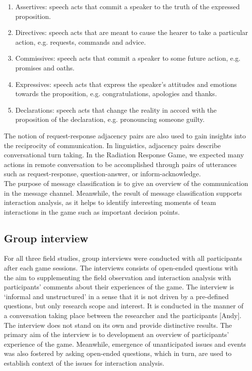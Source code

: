\begin{enumerate}
\item Assertives: speech acts that commit a speaker to the truth of the expressed proposition.
\item Directives: speech acts that are meant to cause the hearer to take a particular action, e.g. requests, commands and advice.
\item Commissives: speech acts that commit a speaker to some future action, e.g. promises and oaths.
\item Expressives: speech acts that express the speaker's attitudes and emotions towards the proposition, e.g. congratulations, apologies and thanks.
\item Declarations: speech acts that change the reality in accord with the proposition of the declaration, e.g. pronouncing someone guilty.
\end{enumerate}

The notion of request-response adjacency pairs are also used to gain insights into the reciprocity of communication. In linguistics, adjacency pairs describe conversational turn taking. In the Radiation Response Game, we expected many actions in remote conversation to be accomplished through pairs of utterances such as request-response, question-answer, or inform-acknowledge.\\

The purpose of message classification is to give an overview of the communication in the message channel. Meanwhile, the result of message classification supports interaction analysis, as it helps to identify interesting moments of team interactions in the game such as important decision points.\\

\subsection{Group interview}
For all three field studies, group interviews were conducted with all participants after each game sessions. The interviews consists of open-ended questions with the aim to supplementing the field observation and interaction analysis with participants' comments about their experiences of the game. The interview is `informal and unstructured' in a sense that it is not driven by a pre-defined questions, but only research scope and interest. It is conducted in the manner of a conversation taking place between the researcher and the participants [Andy].  The interview does not stand on its own and provide distinctive results. The primary aim of the interview is to development an overview of participants' experience of the game. Meanwhile, emergence of unanticipated issues and events was also fostered by asking open-ended questions, which in turn, are used to establish context of the issues for interaction analysis.\\


